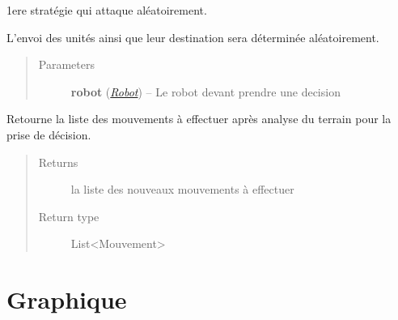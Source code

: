 \documentclass[letterpaper,10pt,english]{sphinxmanual}
\begin{document}
\begin{fulllineitems}
\label{index:StrategieAleatoire.StrategieAleatoire}
1ere stratégie qui attaque aléatoirement.

L'envoi des unités ainsi que leur destination sera déterminée aléatoirement.
\begin{quote}\begin{description}
\item[{Parameters}] \leavevmode
\textbf{robot} ({\hyperref[index:module-Robot]{\emph{Robot}}}) -- Le robot devant prendre une decision

\end{description}\end{quote}

\begin{fulllineitems}
\label{index:StrategieAleatoire.StrategieAleatoire.decider}
Retourne la liste des mouvements à effectuer après analyse du terrain pour la prise de décision.
\begin{quote}\begin{description}
\item[{Returns}] \leavevmode
la liste des nouveaux mouvements à effectuer

\item[{Return type}] \leavevmode
List\textless{}Mouvement\textgreater{}

\end{description}\end{quote}

\end{fulllineitems}


\end{fulllineitems}



\chapter{Graphique}
\label{index:module-Graphique}\label{index:graphique}
\end{document}
